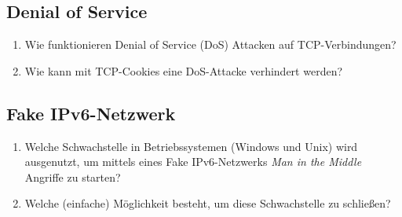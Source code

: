 \subsection*{Denial of Service}

\begin{enumerate}
\item Wie funktionieren Denial of Service (DoS) Attacken auf TCP-Verbindungen?
\item Wie kann mit TCP-Cookies eine DoS-Attacke verhindert werden?
\end{enumerate}

\subsection*{Fake IPv6-Netzwerk}

\begin{enumerate}
\item Welche Schwachstelle in Betriebssystemen (Windows und Unix) wird ausgenutzt, um mittels eines Fake IPv6-Netzwerks \textit{Man in the Middle} Angriffe zu starten?
\item Welche (einfache) Möglichkeit besteht, um diese Schwachstelle zu schließen?
\end{enumerate}